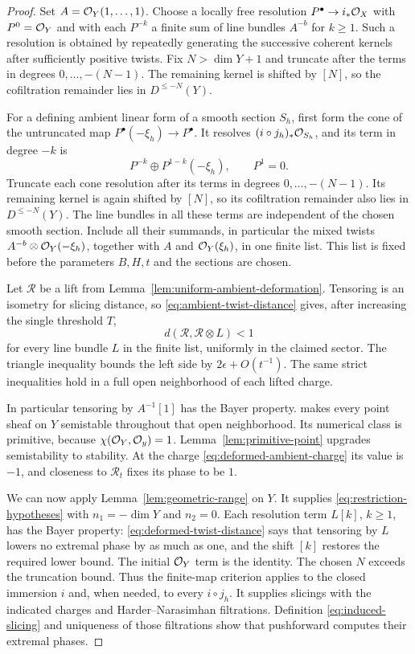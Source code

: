 \begin{proof}
Set $A=\mathcal O_Y(1,\ldots,1)$. Choose a locally free resolution
$P^\bullet\to i_*\mathcal O_X$ with $P^0=\mathcal O_Y$ and with each $P^{-k}$ a
finite sum of line bundles $A^{-b}$ for $k\ge1$. Such a resolution is
obtained by repeatedly generating the successive coherent kernels after
sufficiently positive twists. Fix $N>\dim Y+1$ and truncate after the
terms in degrees $0,\ldots,-(N-1)$. The remaining kernel is shifted by
$[N]$, so the cofiltration remainder lies in $D^{\le-N}(Y)$.

For a defining ambient linear form of a smooth section $S_h$, first form
the cone of the untruncated map
$P^\bullet(-\xi_h)\to P^\bullet$. It resolves
$(i\circ j_h)_*\mathcal O_{S_h}$, and its term in degree $-k$ is
\[
 P^{-k}\oplus P^{1-k}(-\xi_h),\qquad P^1=0.
\]
Truncate each cone resolution after its terms in degrees
$0,\ldots,-(N-1)$. Its remaining kernel is again shifted by $[N]$, so
its cofiltration remainder also lies in $D^{\le-N}(Y)$.
The line bundles in all these terms are independent of the chosen smooth
section. Include all their summands, in particular the mixed twists
$A^{-b}\otimes\mathcal O_Y(-\xi_h)$, together with $A$ and $\mathcal O_Y(\xi_h)$,
in one finite list. This list is fixed before the parameters $B,H,t$ and
the sections are chosen.

Let $\mathcal R$ be a lift from
Lemma~\ref{lem:uniform-ambient-deformation}.  Tensoring is an isometry for
slicing distance, so \eqref{eq:ambient-twist-distance} gives, after
increasing the single threshold $T$,
\begin{equation}\label{eq:deformed-twist-distance}
 d(\mathcal R,\mathcal R\otimes L)<1
\end{equation}
for every line bundle $L$ in the finite list, uniformly in the claimed
sector.  The triangle inequality bounds the left side by
$2\epsilon+O(t^{-1})$.  The same strict inequalities hold in a full open
neighborhood of each lifted charge.

In particular tensoring by $A^{-1}[1]$ has the Bayer property.
\cite[Proposition~3.27]{LiEtAl2026} makes every point sheaf on $Y$
semistable throughout that open neighborhood.  Its numerical class is
primitive, because $\chi(\mathcal O_Y,\mathcal O_y)=1$.
Lemma~\ref{lem:primitive-point} upgrades semistability to stability.
At the charge \eqref{eq:deformed-ambient-charge} its value is $-1$, and
closeness to $\mathcal R_t$ fixes its phase to be $1$.

We can now apply Lemma~\ref{lem:geometric-range} on $Y$.
It supplies \eqref{eq:restriction-hypotheses} with
$n_1=-\dim Y$ and $n_2=0$.  Each resolution term $L[k]$, $k\ge1$, has
the Bayer property: \eqref{eq:deformed-twist-distance} says that tensoring
by $L$ lowers no extremal phase by as much as one, and the shift $[k]$
restores the required lower bound.  The initial $\mathcal O_Y$ term is the
identity.  The chosen $N$ exceeds the truncation bound.  Thus the
finite-map criterion applies to the closed immersion $i$ and, when needed,
to every $i\circ j_h$.  It supplies slicings with the indicated charges
and Harder--Narasimhan filtrations.  Definition
\eqref{eq:induced-slicing} and uniqueness of those filtrations show that
pushforward computes their extremal phases.


\end{proof}
